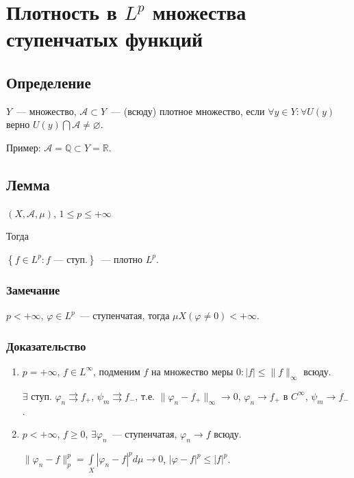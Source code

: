 \documentclass{article}
\begin{document}
    \newpage
    
    \section{Плотность в $L^p$ множества ступенчатых функций}
    
        \subsection{Определение}
        
            $Y$~--- множество, $\mathcal{A} \subset Y$~--- (всюду) плотное множество, если $\forall y \in Y : \forall U(y)$ верно $U(y) \bigcap \mathcal{A} \neq \varnothing$.
        
            Пример: $\mathcal{A} = \mathbb{Q} \subset Y = \mathbb{R}$.
        
        \subsection{Лемма} 
    
            $(X, \mathcal{A}, \mu)$, $1 \leqslant p \leqslant +\infty$
        
            Тогда
        
            $\left\{ f \in L^p : f \text{~--- ступ.} \right\}$~--- плотно $L^p$.
        
            \subsubsection{Замечание}
    
                $p < +\infty$, $\varphi \in L^p$~--- ступенчатая, тогда $\mu X(\varphi \neq 0) < +\infty$.
        
            \subsubsection{Доказательство}
        
                \begin{enumerate}
            
                    \item $p = +\infty$, $f \in L^{\infty}$, подменим $f$ на множество меры $0 : |f| \leqslant \| f \|_{\infty}$ всюду.
                
                        $\exists$ ступ. $\varphi_n \rightrightarrows f_+$, $\psi_m \rightrightarrows f_-$, т.е. $\| \varphi_n - f_+ \|_{\infty} \rightarrow 0$, $\varphi_n \rightarrow f_+$ в $C^{\infty}$, $\psi_m \rightarrow f_-$.
                
                    \item $p < +\infty$, $f \geqslant 0$, $\exists \varphi_n$~--- ступенчатая, $\varphi_n \rightarrow f$ всюду.
                
                        $\| \varphi_n - f \|^p_p = \int\limits_X |\varphi_n - f|^p d \mu \rightarrow 0$, $| \varphi - f|^p \leqslant |f|^p$.
                
                \end{enumerate}
                
\end{document}
